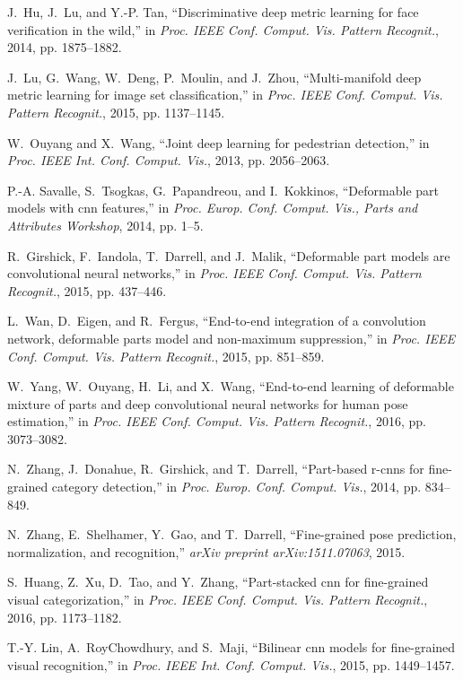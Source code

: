 \documentclass[10pt,journal,cspaper,compsoc]{IEEEtran}
\begin{document}
\begin{thebibliography}{10}
J.~Hu, J.~Lu, and Y.-P. Tan, ``Discriminative deep metric learning for face
  verification in the wild,'' in \emph{Proc. IEEE Conf. Comput. Vis. Pattern
  Recognit.}, 2014, pp. 1875--1882.

J.~Lu, G.~Wang, W.~Deng, P.~Moulin, and J.~Zhou, ``Multi-manifold deep metric
  learning for image set classification,'' in \emph{Proc. IEEE Conf. Comput.
  Vis. Pattern Recognit.}, 2015, pp. 1137--1145.

W.~Ouyang and X.~Wang, ``Joint deep learning for pedestrian detection,'' in
  \emph{Proc. IEEE Int. Conf. Comput. Vis.}, 2013, pp. 2056--2063.

P.-A. Savalle, S.~Tsogkas, G.~Papandreou, and I.~Kokkinos, ``Deformable part
  models with cnn features,'' in \emph{Proc. Europ. Conf. Comput. Vis., Parts
  and Attributes Workshop}, 2014, pp. 1--5.

R.~Girshick, F.~Iandola, T.~Darrell, and J.~Malik, ``Deformable part models are
  convolutional neural networks,'' in \emph{Proc. IEEE Conf. Comput. Vis.
  Pattern Recognit.}, 2015, pp. 437--446.

L.~Wan, D.~Eigen, and R.~Fergus, ``End-to-end integration of a convolution
  network, deformable parts model and non-maximum suppression,'' in \emph{Proc.
  IEEE Conf. Comput. Vis. Pattern Recognit.}, 2015, pp. 851--859.

W.~Yang, W.~Ouyang, H.~Li, and X.~Wang, ``End-to-end learning of deformable
  mixture of parts and deep convolutional neural networks for human pose
  estimation,'' in \emph{Proc. IEEE Conf. Comput. Vis. Pattern Recognit.},
  2016, pp. 3073--3082.

N.~Zhang, J.~Donahue, R.~Girshick, and T.~Darrell, ``Part-based r-cnns for
  fine-grained category detection,'' in \emph{Proc. Europ. Conf. Comput. Vis.},
  2014, pp. 834--849.

N.~Zhang, E.~Shelhamer, Y.~Gao, and T.~Darrell, ``Fine-grained pose prediction,
  normalization, and recognition,'' \emph{arXiv preprint arXiv:1511.07063},
  2015.

S.~Huang, Z.~Xu, D.~Tao, and Y.~Zhang, ``Part-stacked cnn for fine-grained
  visual categorization,'' in \emph{Proc. IEEE Conf. Comput. Vis. Pattern
  Recognit.}, 2016, pp. 1173--1182.

T.-Y. Lin, A.~RoyChowdhury, and S.~Maji, ``Bilinear cnn models for fine-grained
  visual recognition,'' in \emph{Proc. IEEE Int. Conf. Comput. Vis.}, 2015, pp.
  1449--1457.


\end{thebibliography}
\end{document}
